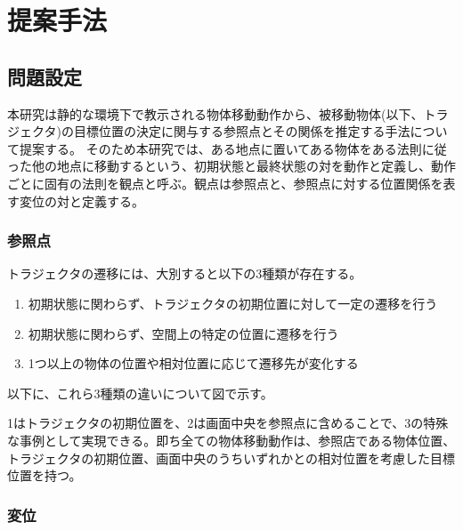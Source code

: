 ﻿%



\chapter{提案手法}

\section{問題設定}

本研究は静的な環境下で教示される物体移動動作から、被移動物体(以下、トラジェクタ)の目標位置の決定に関与する参照点とその関係を推定する手法について提案する。
そのため本研究では、ある地点に置いてある物体をある法則に従った他の地点に移動するという、初期状態と最終状態の対を動作と定義し、動作ごとに固有の法則を観点と呼ぶ。観点は参照点と、参照点に対する位置関係を表す変位の対と定義する。

\subsection{参照点}

トラジェクタの遷移には、大別すると以下の3種類が存在する。

	\begin{enumerate}
		\item 初期状態に関わらず、トラジェクタの初期位置に対して一定の遷移を行う
		\item 初期状態に関わらず、空間上の特定の位置に遷移を行う
		\item 1つ以上の物体の位置や相対位置に応じて遷移先が変化する
	\end{enumerate}
以下に、これら3種類の違いについて図で示す。


1はトラジェクタの初期位置を、2は画面中央を参照点に含めることで、3の特殊な事例として実現できる。即ち全ての物体移動動作は、参照店である物体位置、トラジェクタの初期位置、画面中央のうちいずれかとの相対位置を考慮した目標位置を持つ。

\subsection{変位}


